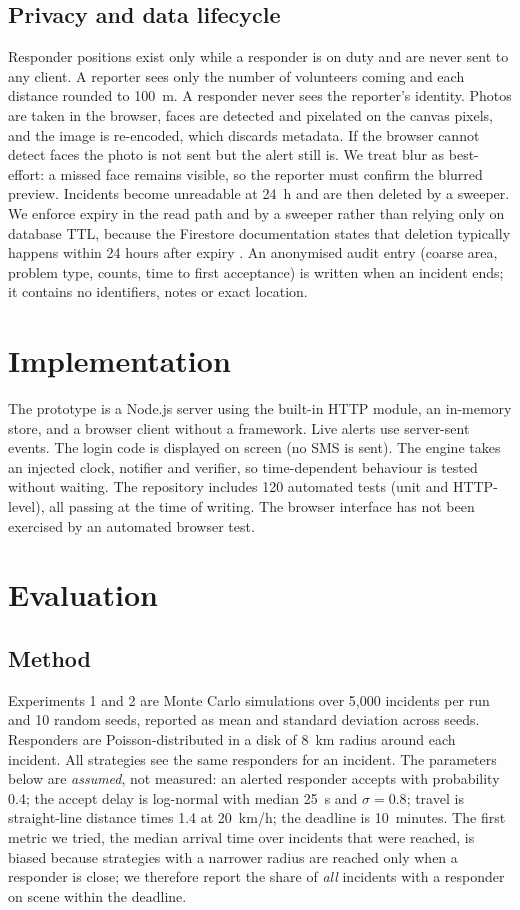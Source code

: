\documentclass[conference]{IEEEtran}
\begin{document}
\subsection{Privacy and data lifecycle}
Responder positions exist only while a responder is on duty and are never sent to any client. A reporter sees only the number of volunteers coming and each distance rounded to 100~m. A responder never sees the reporter's identity. Photos are taken in the browser, faces are detected and pixelated on the canvas pixels, and the image is re-encoded, which discards metadata. If the browser cannot detect faces the photo is not sent but the alert still is. We treat blur as best-effort: a missed face remains visible, so the reporter must confirm the blurred preview. Incidents become unreadable at 24~h and are then deleted by a sweeper. We enforce expiry in the read path and by a sweeper rather than relying only on database TTL, because the Firestore documentation states that deletion typically happens within 24 hours after expiry \cite{firebase_ttl}. An anonymised audit entry (coarse area, problem type, counts, time to first acceptance) is written when an incident ends; it contains no identifiers, notes or exact location.

\section{Implementation}
The prototype is a Node.js server using the built-in HTTP module, an in-memory store, and a browser client without a framework. Live alerts use server-sent events. The login code is displayed on screen (no SMS is sent). The engine takes an injected clock, notifier and verifier, so time-dependent behaviour is tested without waiting. The repository includes 120 automated tests (unit and HTTP-level), all passing at the time of writing. The browser interface has not been exercised by an automated browser test.

\section{Evaluation}
\subsection{Method}
Experiments 1 and 2 are Monte Carlo simulations over 5{,}000 incidents per run and 10 random seeds, reported as mean and standard deviation across seeds. Responders are Poisson-distributed in a disk of 8~km radius around each incident. All strategies see the same responders for an incident. The parameters below are \emph{assumed}, not measured: an alerted responder accepts with probability 0.4; the accept delay is log-normal with median 25~s and $\sigma=0.8$; travel is straight-line distance times 1.4 at 20~km/h; the deadline is 10~minutes. The first metric we tried, the median arrival time over incidents that were reached, is biased because strategies with a narrower radius are reached only when a responder is close; we therefore report the share of \emph{all} incidents with a responder on scene within the deadline.
\end{document}
